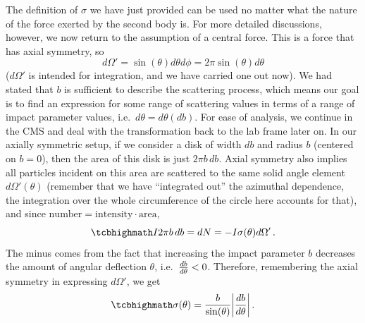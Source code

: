 \documentclass[../class_mech_main.tex]{subfiles}
\begin{document}
The definition of $\sigma$ we have just provided can be used no matter what the nature of the force exerted by the second body is. For more detailed discussions, however, we now return to the assumption of a central force. This is a force that has axial symmetry, so
\begin{equation}
	d\Omega' = \sin(\theta) d\theta d\phi = 2\pi \sin(\theta) d\theta
\end{equation}
($d\Omega'$ is intended for integration, and we have carried one out now). We had stated that $b$ is sufficient to describe the scattering process, which means our goal is to find an expression for some range of scattering values in terms of a range of impact parameter values, i.e.~$d\theta = d\theta(db)$. For ease of analysis, we continue in the CMS and deal with the transformation back to the lab frame later on. In our axially symmetric setup, if we consider a disk of width $db$ and radius $b$ (centered on $b = 0$), then the area of this disk is just $2\pi b \, db$. Axial symmetry also implies all particles incident on this area are scattered to the same solid angle element $d\Omega'(\theta)$ (remember that we have \enquote{integrated out} the azimuthal dependence, the integration over the whole circumference of the circle here accounts for that), and since $\mathrm{number} = \mathrm{intensity} \cdot \mathrm{area}$,
\begin{equation}
	\eqbox{
		I 2\pi b \, db = dN = - I \sigma(\theta) d\Omega' %
	} \, .
\end{equation}
The minus comes from the fact that increasing the impact parameter $b$ decreases the amount of angular deflection $\theta$, i.e.~$\dv{b}{\theta} < 0$. Therefore, remembering the axial symmetry in expressing $d\Omega'$, we get
\begin{equation}\label{eq:cross_section_cms_2}
	\eqbox{
		\sigma(\theta) = \frac{b}{\sin(\theta)} \abs{\dv{b}{\theta}}
	} \, .
\end{equation}
\end{document}
